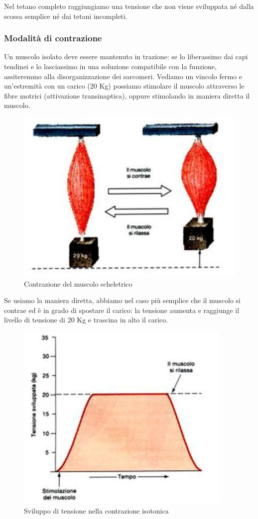 \documentclass[a4paper,12pt]{article}
\begin{document}
Nel tetano completo raggiungiamo una tensione che non viene sviluppata né dalla scossa semplice né dai tetani incompleti.

\subsubsection{Modalità di contrazione}
Un muscolo isolato deve essere mantenuto in trazione: se lo liberassimo dai capi tendinei e lo lasciassimo in una soluzione compatibile con la funzione, assiteremmo alla disorganizzazione dei sarcomeri. Vediamo un vincolo fermo e un'estremità con un carico (20 Kg) possiamo stimolare il muscolo attraverso le fibre motrici (attivazione transinaptica), oppure stimolando in maniera diretta il muscolo.

\begin{figure}[H]
\centering
\includegraphics[scale=0.4]{immagine/contrazione.jpg}
\caption{Contrazione del muscolo scheletrico}
\end{figure}

 Se usiamo la maniera diretta, abbiamo nel caso più semplice che il muscolo si contrae ed è in grado di spostare il carico: la tensione aumenta e raggiunge il livello di tensione di 20 Kg e trascina in alto il carico.
\begin{figure}[H]
\centering
\includegraphics[scale=0.4]{immagine/isometrica.jpg}
\caption{Sviluppo di tensione nella contrazione isotonica}
\end{figure}
\end{document}
